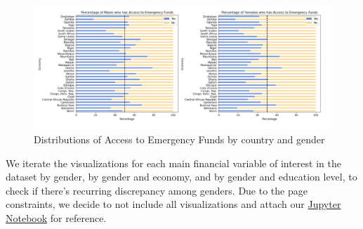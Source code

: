 \documentclass[12pt]{article}
\begin{document}
\begin{figure}

{\centering \includegraphics[width=1\linewidth]{graphs/country_graph10} 

}

\caption{Distributions of Access to Emergency Funds by country and gender}\label{fig:unnamed-chunk-13}
\end{figure}

We iterate the visualizations for each main financial variable of
interest in the dataset by gender, by gender and economy, and by gender
and education level, to check if there's recurring discrepancy among
genders. Due to the page constraints, we decide to not include all
visualizations and attach our
\href{https://drive.google.com/file/d/1f9AauOn4I2Rl5io_viMw0WbEXKFiJcRA/view?usp=sharing}{Jupyter
Notebook} for reference.



\end{document}
